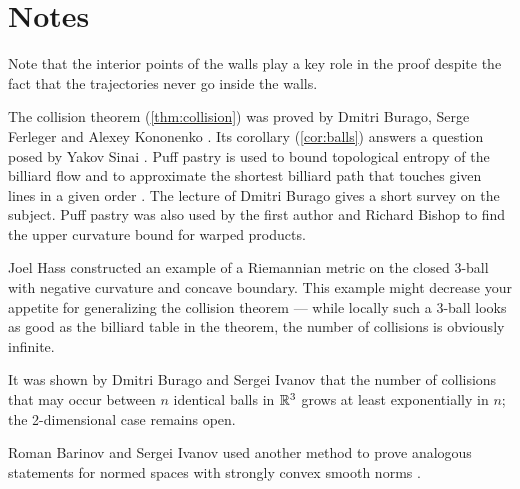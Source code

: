\section{Notes}

Note that the interior points of the walls play a key role in the proof
despite the fact  that the trajectories never go inside the walls.

The collision theorem (\ref{thm:collision}) was proved by Dmitri Burago, Serge Ferleger and Alexey Kononenko \cite{burago-ferleger-kononenko-1997}.
Its corollary (\ref{cor:balls}) answers a question posed by Yakov Sinai \cite{galperin}.
Puff pastry is used to bound topological entropy of the billiard flow 
and to approximate the shortest billiard path that  touches given lines in a given order \cite{burago-ferleger-kononenko-1998,burago-grigoriev-slissenko}.
The lecture of Dmitri Burago \cite{burago-1998} gives a short survey on the subject.
Puff pastry was also used by the first author and Richard Bishop \cite{alexander-bishop-1998-Warped}
to find the upper curvature bound for warped products.

Joel Hass \cite{hass} constructed an example of a Riemannian metric on the closed 3-ball with negative curvature and concave boundary.
This example might decrease your appetite for generalizing the collision theorem --- while
locally such a 3-ball looks as good as the billiard table in the theorem, the number of collisions is obviously infinite.

It was shown by Dmitri Burago and Sergei Ivanov \cite{burago-ivanov} that the number of collisions that may occur between $n$ identical balls in $\mathbb{R}^3$ grows at least exponentially in $n$; the 2-dimensional case remains open.

Roman Barinov and Sergei Ivanov used another method to prove analogous statements for normed spaces with strongly convex smooth norms \cite{barinov-ivanov}.
